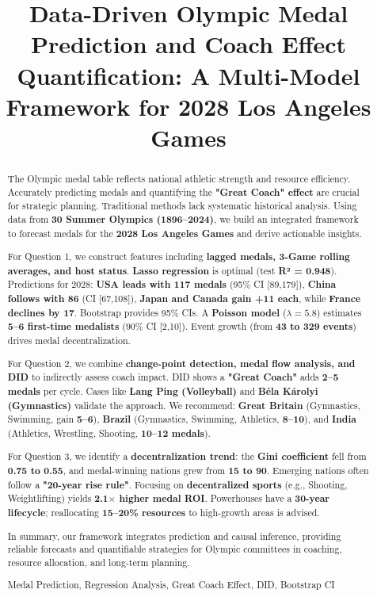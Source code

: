 \documentclass{mcmthesis}
\title{Data-Driven Olympic Medal Prediction and Coach Effect Quantification: A Multi-Model Framework for 2028 Los Angeles Games}
\begin{document}
\setlength{\parindent}{1.5em} 

\begin{abstract}
\setlength{\parindent}{1.5em} 

The Olympic medal table reflects national athletic strength and resource efficiency. Accurately predicting medals and quantifying the \textbf{"Great Coach" effect} are crucial for strategic planning. Traditional methods lack systematic historical analysis. Using data from \textbf{30 Summer Olympics (1896--2024)}, we build an integrated framework to forecast medals for the \textbf{2028 Los Angeles Games} and derive actionable insights.

For Question 1, we construct features including \textbf{lagged medals, 3-Game rolling averages, and host status}. \textbf{Lasso regression} is optimal (test \textbf{R² = 0.948}). Predictions for 2028: \textbf{USA leads with 117 medals} (95\% CI [89,179]), \textbf{China follows with 86} (CI [67,108]), \textbf{Japan and Canada gain +11 each}, while \textbf{France declines by 17}. Bootstrap provides 95\% CIs. A \textbf{Poisson model} (\(\lambda = 5.8\)) estimates \textbf{5--6 first-time medalists} (90\% CI [2,10]). Event growth (from \textbf{43 to 329 events}) drives medal decentralization.

For Question 2, we combine \textbf{change-point detection, medal flow analysis, and DID} to indirectly assess coach impact. DID shows a \textbf{"Great Coach"} adds \textbf{2--5 medals} per cycle. Cases like \textbf{Lang Ping (Volleyball)} and \textbf{Béla Károlyi (Gymnastics)} validate the approach. We recommend: \textbf{Great Britain} (Gymnastics, Swimming, gain \textbf{5--6}), \textbf{Brazil} (Gymnastics, Swimming, Athletics, \textbf{8--10}), and \textbf{India} (Athletics, Wrestling, Shooting, \textbf{10--12 medals}).

For Question 3, we identify a \textbf{decentralization trend}: the \textbf{Gini coefficient} fell from \textbf{0.75 to 0.55}, and medal-winning nations grew from \textbf{15 to 90}. Emerging nations often follow a \textbf{"20-year rise rule"}. Focusing on \textbf{decentralized sports} (e.g., Shooting, Weightlifting) yields \textbf{2.1$\times$ higher medal ROI}. Powerhouses have a \textbf{30-year lifecycle}; reallocating \textbf{15--20\% resources} to high-growth areas is advised.

In summary, our framework integrates prediction and causal inference, providing reliable forecasts and quantifiable strategies for Olympic committees in coaching, resource allocation, and long-term planning.
\small
\begin{keywords}
Medal Prediction, Regression Analysis, Great Coach Effect, DID, Bootstrap CI
\end{keywords}
\end{abstract}
\maketitle
\tableofcontents
\newpage
\end{document}
